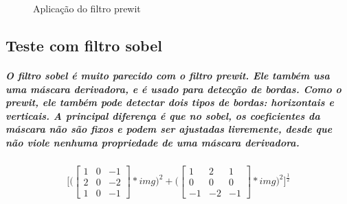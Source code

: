 \documentclass[12pt,fleqn]{article}
\begin{document}
  \begin{figure}[!htb]
  \centering
  \caption{Aplicação do filtro prewit}
  \label{fig:Resultado 1}
  \end{figure}

  \subsection{Teste com filtro sobel}

  \subparagraph{\normalfont O filtro sobel é muito parecido com o filtro prewit. Ele também usa uma máscara derivadora, e é usado para detecção de bordas. 
  Como o prewit, ele também pode detectar dois tipos de bordas: horizontais e verticais. A principal diferença é que no sobel, os coeficientes da máscara
  não são fixos e podem ser ajustadas livremente, desde que não viole nenhuma propriedade de uma máscara derivadora.
  }

  \begin{equation*}
    
    \Bigg[

      \Bigg(\begin{bmatrix}
          1 & 0 & -1 \\
          2 & 0 & -2 \\
          1 & 0 & -1 
      \end{bmatrix}
      * img\Bigg)^2
      +
      
      \Bigg(\begin{bmatrix}
          1 & 2 & 1 \\
          0 & 0 & 0 \\
          -1 & -2 & -1 
      \end{bmatrix}
      * img\Bigg)^2

    \Bigg]^\frac{1}{2}
  \end{equation*}
\end{document}
